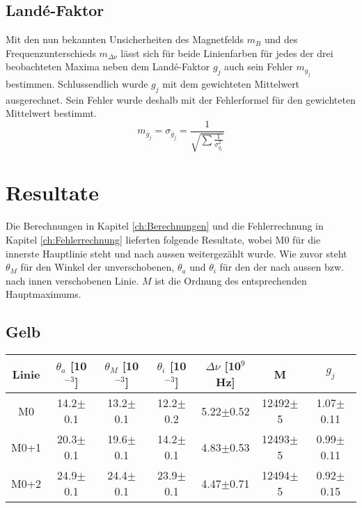 \documentclass[a4paper,parskip,11pt, DIV12]{scrreprt}
\begin{document}
	\section{Landé-Faktor}
	
	Mit den nun bekannten Unsicherheiten des Magnetfelds $m_B$ und des Frequenzunterschieds $m_{\Delta \nu}$ lässt sich für beide Linienfarben für jedes der drei beobachteten Maxima neben dem Landé-Faktor $g_j$ auch sein Fehler $m_{g_j}$bestimmen. Schlussendlich wurde $g_j$ mit dem gewichteten Mittelwert ausgerechnet. Sein Fehler wurde deshalb mit der Fehlerformel für den gewichteten Mittelwert bestimmt. 
	\begin{equation}
	\label{Fehler gewichteter Mittelwert}
	m _{\bar{g}_j} = \sigma_{\bar{g}_j} = \frac{1}{\sqrt{\sum \frac{1}{\sigma_{g_i}^2}}}
	\end{equation}
	
	\chapter{Resultate}
	\label{ch:Resultate}
	
	Die Berechnungen in Kapitel \ref{ch:Berechnungen} und die Fehlerrechnung in Kapitel \ref{ch:Fehlerrechnung} lieferten folgende Resultate, wobei M0 für die innerste Hauptlinie steht und nach aussen weitergezählt wurde. Wie zuvor steht $\theta_M$ für den Winkel der unverschobenen, $\theta_a$ und $\theta_i$ für den der nach aussen bzw. nach innen verschobenen Linie. $M$ ist die Ordnung des entsprechenden Hauptmaximums.
	
	\section{Gelb}
	
\begin{tabular}{|c|c|c|c|c|c|c|}
\hline 
Linie  & $\theta_a$ [10$^{-3}$] & $\theta_M$ [10$^{-3}$]& $\theta_i$ [10$^{-3}$]& $\Delta \nu$ [10$^{9}$Hz] & M & $g_j$ \\ 
\hline 
\hline
M0 & 14.2$\pm$0.1 & 13.2$\pm$0.1 & 12.2$\pm$0.2 & 5.22$\pm$0.52 & 12492$\pm$5 & 1.07$\pm$0.11  \\ 
\hline 
M0+1 & 20.3$\pm$0.1 & 19.6$\pm$0.1 & 14.2$\pm$0.1 & 4.83$\pm$0.53 & 12493$\pm$5 & 0.99$\pm$0.11 \\ 
\hline 
M0+2 & 24.9$\pm$0.1 & 24.4$\pm$0.1 & 23.9$\pm$0.1 & 4.47$\pm$0.71 & 12494$\pm$5 & 0.92$\pm$0.15  \\ 
\hline
\end{tabular} 
\end{document}
